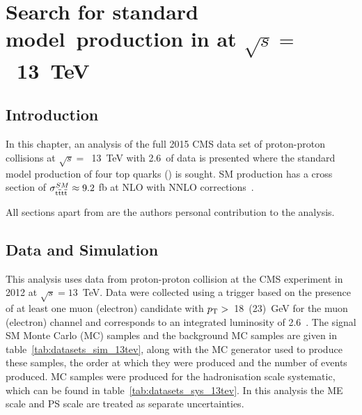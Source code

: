 \chapter{Search for standard model~\tttt production in \runtwo at $\sqrt{s} =$~13~TeV \label{c:Run2}}
\section{Introduction}
In this chapter, an analysis of the full 2015 CMS data set of proton-proton collisions at $\sqrt{s} =$~13~TeV with 2.6~\fbinv of data is presented where the standard model production of four top quarks (\tttt) is sought. SM \tttt production has a cross section of $\sigma_{{\mathrm{t}\overline{\mathrm{t}}\mathrm{t}\overline{\mathrm{t}}}}^{SM}  \approx 9.2$ fb at NLO with NNLO corrections~\cite{Alwall2014,Bevilacqua2012}. 

All sections apart from  are the authors personal contribution to the analysis.

\section{Data and Simulation}
\label{sec:datasimulation13}
This analysis uses data from proton-proton collision at the CMS experiment in 2012 at $\sqrt{s}=13$~TeV.
Data were collected using a trigger based on the presence of at least one muon (electron) candidate with $p_{\mathrm{T}} > $~18~(23)~GeV for the muon (electron) channel and corresponds to an integrated luminosity of 2.6~\fbinv .
The signal SM \tttt Monte Carlo (MC) samples and the background MC samples are given in table~\ref{tab:datasets_sim_13tev}, along with the MC generator used to produce these samples, the order at which they were produced and the number of events produced. MC samples were produced for the hadronisation scale systematic, which can be found in table~\ref{tab:datasets_sys_13tev}. In this analysis the ME scale and PS scale are treated as separate uncertainties.

